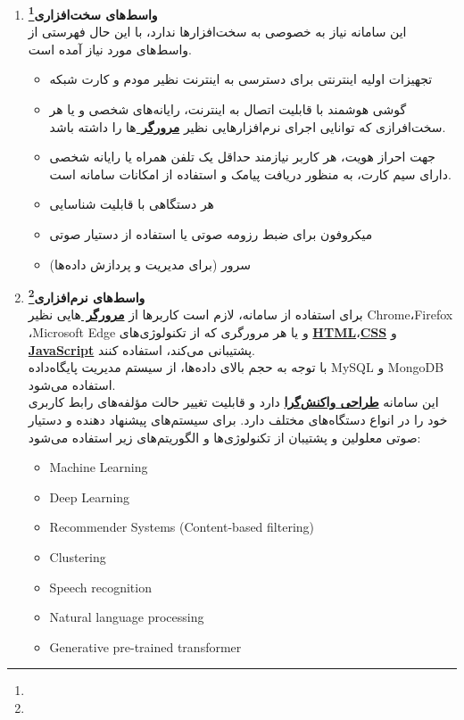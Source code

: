 \documentclass[12pt]{article}
\begin{document}
\begin{enumerate}
		\item
		\textbf{واسط‌های سخت‌افزاری\footnote{}}\\
		این سامانه نیاز به ‌خصوصی به سخت‌افزار‌ها ندارد، با این حال فهرستی از واسط‌های مورد نیاز آمده است.
		\begin{itemize}
			\item
			تجهیزات اولیه اینترنتی برای دسترسی به اینترنت نظیر مودم و کارت شبکه
			\item
			گوشی هوشمند با قابلیت اتصال به اینترنت، رایانه‌های شخصی و یا هر سخت‌افرازی که توانایی اجرای نرم‌افزارهایی نظیر \textbf{\hyperref[ref:browser]{مرورگر }}ها را داشته باشد.
			\item
			جهت احراز هویت، هر کاربر نیازمند حداقل یک تلفن همراه یا رایانه شخصی دارای سیم کارت، به منظور دریافت پیامک و استفاده از امکانات سامانه است.
			\item
			هر دستگاهی با قابلیت شناسایی 
			\item
			میکروفون برای ضبط رزومه صوتی یا استفاده از دستیار صوتی
			\item
			سرور (برای مدیریت و پردازش داده‌ها)
		\end{itemize}

		\item
		\label{vaset-nrm}\textbf{واسط‌های نرم‌افزاری\footnote{}}\\
		برای استفاده از سامانه،‌ لازم است کاربرها از \textbf{\hyperref[ref:browser]{مرورگر }}‌هایی نظیر Chrome،Firefox ،Microsoft Edge و یا هر مرورگری که از تکنولوژی‌های \textbf{\hyperref[ref:html]{HTML}}،\textbf{\hyperref[ref:css]{CSS}}  و \textbf{\hyperref[ref:js]{JavaScript}} پشتیبانی می‌کند،‌ استفاده کنند.\\
		با توجه به حجم بالای داده‌ها، از سیستم مدیریت پایگاه‌داده MySQL و MongoDB استفاده می‌شود.\\
		این سامانه
		\textbf{\hyperref[ref:responsive]{طراحی واکنش‌گرا}}
		دارد و قابلیت تغییر حالت مؤلفه‌های رابط کاربری خود را در انواع دستگاه‌های مختلف دارد. برای سیستم‌های پیشنهاد دهنده و دستیار صوتی معلولین و پشتیبان از تکنولوژی‌ها و الگوریتم‌های زیر استفاده می‌شود:
		\begin{itemize}
			\item
			Machine Learning
			\item
			Deep Learning
			\item
			Recommender Systems (Content-based filtering)
			\item
			Clustering
			\item
			Speech recognition
			\item
			Natural language processing
			\item
			Generative pre-trained transformer
		\end{itemize}


\end{enumerate}
\end{document}
